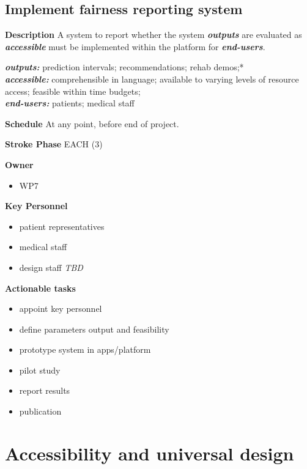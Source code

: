 \documentclass[
  letterpaper,
  DIV=11,
  numbers=noendperiod]{scrreport}
\providecommand{\tightlist}{%
  \setlength{\itemsep}{0pt}\setlength{\parskip}{0pt}}\usepackage{longtable,booktabs,array}
\begin{document}
\hypertarget{implement-fairness-reporting-system}{%
\subsection{Implement fairness reporting
system}\label{implement-fairness-reporting-system}}

\textbf{Description} A system to report whether the system
\textbf{\emph{outputs}} are evaluated as \textbf{\emph{accessible}} must
be implemented within the platform for \textbf{\emph{end-users}}.

\emph{\textbf{outputs:} }prediction intervals; recommendations; rehab
demos;*\\
\textbf{\emph{accessible:}} comprehensible in language; available to
varying levels of resource access; feasible within time budgets;\\
\textbf{\emph{end-users:}} patients; medical staff

\textbf{Schedule} At any point, before end of project.

\textbf{Stroke Phase} EACH (3)

\textbf{Owner}

\begin{itemize}
\tightlist
\item
  WP7
\end{itemize}

\textbf{Key Personnel}

\begin{itemize}
\tightlist
\item
  patient representatives
\item
  medical staff
\item
  design staff \emph{TBD}
\end{itemize}

\textbf{Actionable tasks}

\begin{itemize}
\tightlist
\item
  appoint key personnel
\item
  define parameters output and feasibility
\item
  prototype system in apps/platform
\item
  pilot study
\item
  report results
\item
  publication
\end{itemize}

\hypertarget{accessibility-and-universal-design}{%
\section{Accessibility and universal
design}\label{accessibility-and-universal-design}}
\end{document}
